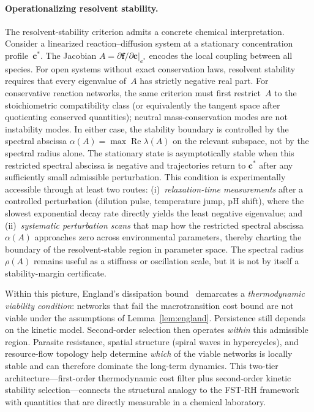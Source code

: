 \documentclass[12pt,a4paper]{article}
\theoremstyle{remark}
\begin{document}
\paragraph{Operationalizing resolvent stability.}
The resolvent-stability criterion admits a concrete chemical interpretation.
Consider a linearized reaction--diffusion system at a stationary concentration
profile~$\mathbf{c}^{*}$.  The Jacobian
$A = \partial \mathbf{f}/\partial \mathbf{c}\big|_{\mathbf{c}^{*}}$
encodes the local coupling between all species.  For open systems without exact
conservation laws, resolvent stability requires that every eigenvalue of~$A$
has strictly negative real part.  For conservative reaction networks, the same
criterion must first restrict~$A$ to the stoichiometric compatibility class (or
equivalently the tangent space after quotienting conserved quantities); neutral
mass-conservation modes are not instability modes.  In either case, the
stability boundary is controlled by the spectral abscissa
$\alpha(A)=\max \operatorname{Re}\lambda(A)$ on the relevant subspace, not by
the spectral radius alone.  The stationary state is asymptotically stable when
this restricted spectral abscissa is negative and trajectories return to
$\mathbf{c}^{*}$ after any sufficiently small admissible perturbation.
This condition is experimentally accessible through at least two routes:
(i)~\emph{relaxation-time measurements} after a controlled perturbation
(dilution pulse, temperature jump, pH shift), where the slowest exponential
decay rate directly yields the least negative eigenvalue; and
(ii)~\emph{systematic perturbation scans} that map how the restricted spectral
abscissa~$\alpha(A)$ approaches zero across environmental parameters, thereby
charting the boundary of the resolvent-stable region in parameter space.
The spectral radius~$\rho(A)$ remains useful as a stiffness or oscillation
scale, but it is not by itself a stability-margin certificate.

Within this picture, England's dissipation bound~\citep{England2013} demarcates
a \emph{thermodynamic viability condition}: networks that fail the
macrotransition cost bound are not viable under the assumptions of
Lemma~\ref{lem:england}.  Persistence still depends on the kinetic model.
Second-order selection then operates \emph{within} this admissible region.
Parasite resistance, spatial structure (spiral waves in hypercycles), and
resource-flow topology help determine \emph{which} of the viable networks is
locally stable and can therefore dominate the long-term dynamics.
This two-tier architecture---first-order thermodynamic cost filter plus
second-order kinetic stability selection---connects the structural analogy to
the FST-RH framework~\citep{GeigerRH2026b} with quantities that are directly
measurable in a chemical laboratory.
\end{document}
